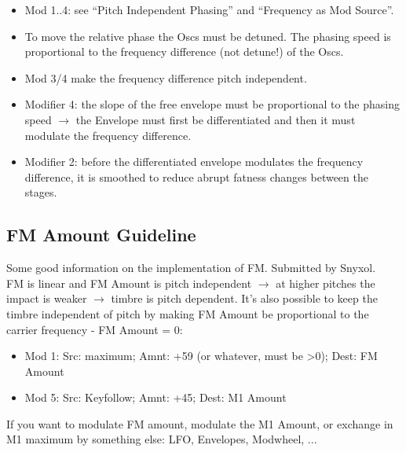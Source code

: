 \begin{itemize}
	\item Mod 1..4: see ``Pitch Independent Phasing'' and ``Frequency as Mod Source''.
	\item To move the relative phase the Oscs must be detuned.
	The phasing speed is proportional to the frequency difference (not detune!) of the Oscs.
	\item Mod 3/4 make the frequency difference pitch independent.
	\item Modifier 4: the slope of the free envelope must be proportional to the phasing speed $\to$ the Envelope must first be differentiated and then it must modulate the frequency difference.
	\item Modifier 2: before the differentiated envelope modulates the frequency difference, it is smoothed to reduce abrupt fatness changes between the stages.
\end{itemize}
\subsection{FM Amount Guideline}
Some good information on the implementation of FM. Submitted by Snyxol.\\
FM is linear and FM Amount is pitch independent $\to$ at higher pitches the impact is weaker $\to$ timbre is pitch dependent. It's also possible to keep the timbre independent of pitch by making FM Amount be proportional to the carrier frequency - FM Amount = 0:
\begin{itemize}
	\item Mod 1: Src: maximum; Amnt: +59 (or whatever, must be >0); Dest: FM Amount
	\item Mod 5: Src: Keyfollow; Amnt: +45; Dest: M1 Amount
\end{itemize}
If you want to modulate FM amount, modulate the M1 Amount, or exchange in M1 maximum by something else: LFO, Envelopes, Modwheel, ...